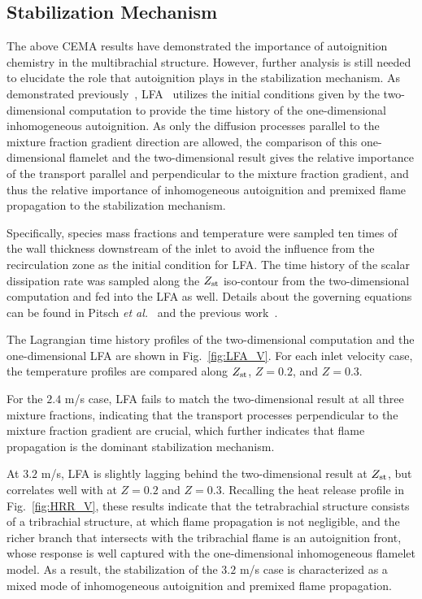 \documentclass{wssci}
\begin{document}
\subsection{Stabilization Mechanism} 
The above CEMA results have demonstrated the importance of autoignition chemistry in the multibrachial structure.  However, further analysis is still needed to elucidate the role that autoignition plays in the stabilization mechanism.  As demonstrated previously~\cite{deng15}, LFA~\cite{pitsch98a} utilizes the initial conditions given by the two-dimensional computation to provide the time history of the one-dimensional inhomogeneous autoignition.  As only the diffusion processes parallel to the mixture fraction gradient direction are allowed, the comparison of this one-dimensional flamelet and the two-dimensional result gives the relative importance of the transport parallel and perpendicular to the mixture fraction gradient, and thus the relative importance of inhomogeneous autoignition and premixed flame propagation to the stabilization mechanism.

Specifically, species mass fractions and temperature were sampled ten times of the wall thickness downstream of the inlet to avoid the influence from the recirculation zone as the initial condition for LFA.  The time history of the scalar dissipation rate was sampled along the $Z_{\rm st}$ iso-contour from the two-dimensional computation and fed into the LFA as well.  Details about the governing equations can be found in Pitsch \emph{et al.}~\cite{pitsch98a} and the previous work~\cite{deng15}.

The Lagrangian time history profiles of the two-dimensional computation and the one-dimensional LFA are shown in Fig.~\ref{fig:LFA_V}.  For each inlet velocity case, the temperature profiles are compared along $Z_{\rm st}$, $Z = 0.2$, and $Z = 0.3$.  

For the $2.4$ m/s case, LFA fails to match the two-dimensional result at all three mixture fractions, indicating that the transport processes perpendicular to the mixture fraction gradient are crucial, which further indicates that flame propagation is the dominant stabilization mechanism.

At $3.2$ m/s, LFA is slightly lagging behind the two-dimensional result at $Z_{\rm st}$, but correlates well with at $Z = 0.2$ and $Z = 0.3$.  Recalling the heat release profile in Fig.~\ref{fig:HRR_V}, these results indicate that the tetrabrachial structure consists of a tribrachial structure, at which flame propagation is not negligible, and the richer branch that intersects with the tribrachial flame is an autoignition front, whose response is well captured with the one-dimensional inhomogeneous flamelet model.  As a result, the stabilization of the $3.2$ m/s case is characterized as a mixed mode of inhomogeneous autoignition and premixed flame propagation.
\end{document}
